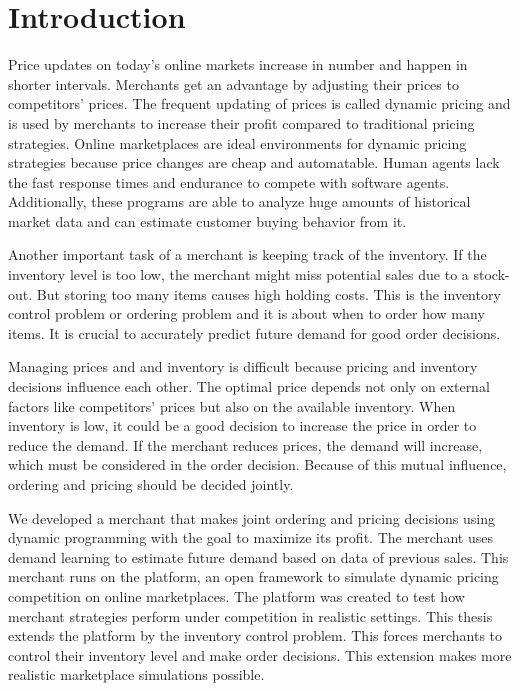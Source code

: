 
\chapter{Introduction}
Price updates on today's online markets increase in number and happen in shorter intervals.
Merchants get an advantage by adjusting their prices to competitors' prices.
The frequent updating of prices is called dynamic pricing and is used by merchants to increase their profit compared to traditional pricing strategies.
Online marketplaces are ideal environments for dynamic pricing strategies because price changes are cheap and automatable.
Human agents lack the fast response times and endurance to compete with software agents.
Additionally, these programs are able to analyze huge amounts of historical market data and can estimate customer buying behavior from it.

Another important task of a merchant is keeping track of the inventory.
If the inventory level is too low, the merchant might miss potential sales due to a stock-out.
But storing too many items causes high holding costs.
This is the inventory control problem or ordering problem and it is about when to order how many items.
It is crucial to accurately predict future demand for good order decisions.

Managing prices and and inventory is difficult because pricing and inventory decisions influence each other.
The optimal price depends not only on external factors like competitors' prices but also on the available inventory.
When inventory is low, it could be a good decision to increase the price in order to reduce the demand.
If the merchant reduces prices, the demand will increase, which must be considered in the order decision.
Because of this mutual influence, ordering and pricing should be decided jointly.

We developed a merchant that makes joint ordering and pricing decisions using dynamic programming with the goal to maximize its profit.
The merchant uses demand learning to estimate future demand based on data of previous sales.
This merchant runs on the \pricewars platform, an open framework to simulate dynamic pricing competition on online marketplaces.
The platform was created to test how merchant strategies perform under competition in realistic settings.
This thesis extends the platform by the inventory control problem.
This forces merchants to control their inventory level and make order decisions.
This extension makes more realistic marketplace simulations possible.


